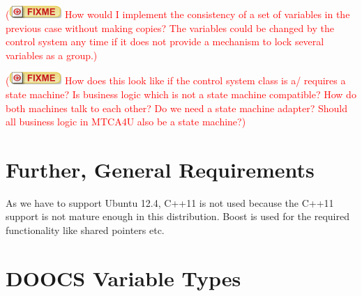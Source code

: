 \documentclass[11pt,a4paper]{scrartcl}
\newcounter{nFixmes}
\newcommand{\fixme}[1]{\addtocounter{nFixmes}{1}\textcolor{red}{(\includegraphics[height=2ex]{fixme} #1)}\xspace}
\begin{document}
\fixme{How would I implement the consistency of a set of variables in the previous case
without making copies? The variables could be changed by the control system any time if
it does not provide a mechanism to lock several variables as a group.}

\fixme{How does this look like if the control system class is a/ requires a state machine?
Is business logic which is not a state machine compatible? How do both machines talk to each other?
Do we need a state machine adapter? Should all business logic in MTCA4U also be a state machine?}

\section{Further, General Requirements}
As we have to support Ubuntu 12.4, C++11 is not used because the C++11 support
is not mature enough in this distribution. Boost is used for the required
functionality like shared pointers etc.

\appendix
\section{DOOCS Variable Types}
\end{document}
